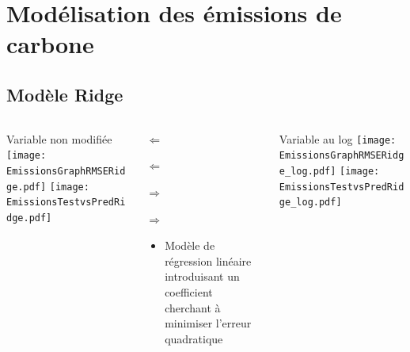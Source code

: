 \documentclass[8pt,aspectratio=169,hyperref={unicode=true}]{beamer}
\begin{document}
\section[Modélisation émissions]{Modélisation des émissions de carbone}
\subsection{Modèle Ridge}
\begin{frame}{\insertsubsection}
  \begin{columns}[t]
    \begin{column}{.33\textwidth}
      \centering Variable non modifiée
      \texttt{[image: EmissionsGraphRMSERidge.pdf]}
      \texttt{[image: EmissionsTestvsPredRidge.pdf]}
    \end{column}
    \begin{column}{.33\textwidth}
      $\Longleftarrow$
      \scriptsize
      {\centering
        }
      

      \normalsize
      $\Longleftarrow$

      \raggedleft $\Longrightarrow$
      \scriptsize
      {\centering
        }
      

      \normalsize
      $\Longrightarrow$

      \raggedright
      \begin{itemize}
        \item Modèle de régression linéaire introduisant un coefficient cherchant à minimiser
              l'erreur quadratique
      \end{itemize}

    \end{column}
    \begin{column}{.33\textwidth}
      \centering Variable au log
      \texttt{[image: EmissionsGraphRMSERidge\_log.pdf]}
      \texttt{[image: EmissionsTestvsPredRidge\_log.pdf]}
    \end{column}
  \end{columns}
\end{frame}
\end{document}
